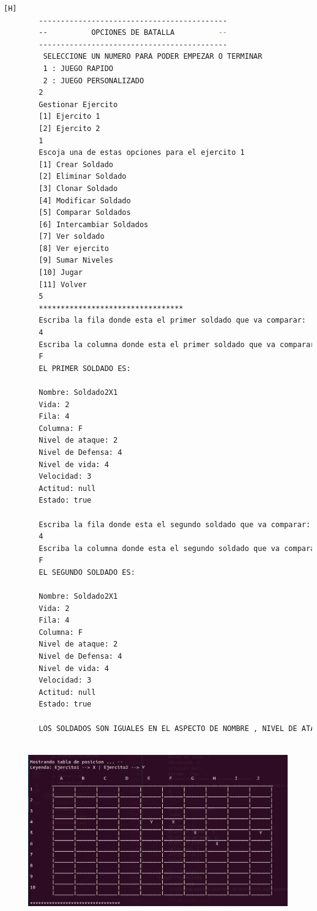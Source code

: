 \documentclass{article}
\begin{document}
	\begin{lstlisting}[language=bash,caption={Ejecucion:}][H]
		-------------------------------------------
		--          OPCIONES DE BATALLA          --
		-------------------------------------------
		 SELECCIONE UN NUMERO PARA PODER EMPEZAR O TERMINAR
		 1 : JUEGO RAPIDO
		 2 : JUEGO PERSONALIZADO
		2
		Gestionar Ejercito 
		[1] Ejercito 1
		[2] Ejercito 2
		1
		Escoja una de estas opciones para el ejercito 1
		[1] Crear Soldado
		[2] Eliminar Soldado
		[3] Clonar Soldado
		[4] Modificar Soldado
		[5] Comparar Soldados
		[6] Intercambiar Soldados
		[7] Ver soldado
		[8] Ver ejercito
		[9] Sumar Niveles
		[10] Jugar
		[11] Volver
		5
		*********************************
		Escriba la fila donde esta el primer soldado que va comparar:
		4
		Escriba la columna donde esta el primer soldado que va comparar:
		F
		EL PRIMER SOLDADO ES:
		
		Nombre: Soldado2X1
		Vida: 2
		Fila: 4
		Columna: F
		Nivel de ataque: 2
		Nivel de Defensa: 4
		Nivel de vida: 4
		Velocidad: 3
		Actitud: null
		Estado: true
		
		Escriba la fila donde esta el segundo soldado que va comparar:
		4
		Escriba la columna donde esta el segundo soldado que va comparar:
		F
		EL SEGUNDO SOLDADO ES:
		
		Nombre: Soldado2X1
		Vida: 2
		Fila: 4
		Columna: F
		Nivel de ataque: 2
		Nivel de Defensa: 4
		Nivel de vida: 4
		Velocidad: 3
		Actitud: null
		Estado: true
		
		LOS SOLDADOS SON IGUALES EN EL ASPECTO DE NOMBRE , NIVEL DE ATAQUE , NIVEL DE DEFENSA , NIVEL DE VIDA ACTUAL Y ESTADO		
		
	\end{lstlisting}
	\begin{figure}[H]
		\centering
		\includegraphics[width=1.0\textwidth,keepaspectratio]{img/Commit8.png}
	\end{figure}
\end{document}
